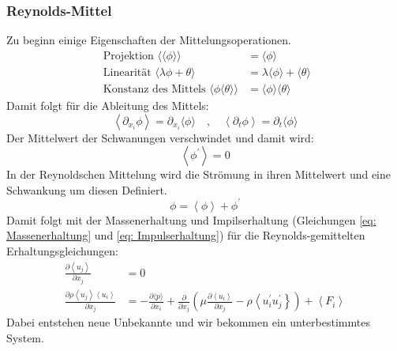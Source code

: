 \subsubsection{Reynolds-Mittel}
Zu beginn einige Eigenschaften der Mittelungsoperationen.
\begin{equation*}
	\begin{aligned}
		\text { Projektion }\langle\langle\phi\rangle\rangle &=\langle\phi\rangle \\
		\text { Linearität }\langle\lambda \phi+\theta\rangle &=\lambda\langle\phi\rangle+\langle\theta\rangle \\
		\text { Konstanz des Mittels }\langle\phi\langle\theta\rangle\rangle &=\langle\phi\rangle\langle\theta\rangle
	\end{aligned}
\end{equation*}
Damit folgt für die Ableitung des Mittels:
\begin{equation}
	\left\langle\partial_{x_{i}} \phi\right\rangle=\partial_{x_{i}}\langle\phi\rangle \quad, \quad\left\langle\partial_{t} \phi\right\rangle=\partial_{t}\langle\phi\rangle
\end{equation}
Der Mittelwert der Schwanungen verschwindet und damit wird: 
\begin{equation}
	\left\langle\phi^{\prime}\right\rangle=0
\end{equation}
In der Reynoldschen Mittelung wird die Strömung in ihren Mittelwert und eine Schwankung um diesen Definiert. 
\begin{equation}
	\phi = \left\langle\phi\right\rangle + \phi^{\prime}
\end{equation}
Damit folgt mit der Massenerhaltung und Impilserhaltung (Gleichungen \ref{eq: Massenerhaltung} und \ref{eq: Impulserhaltung}) für die Reynolds-gemittelten Erhaltungsgleichungen:
\begin{equation}
	\begin{aligned}
		\frac{\partial\left\langle u_{j}\right\rangle}{\partial x_{j}}&=0 \\
		\frac{\partial \rho\left\langle u_{j}\right\rangle\left\langle u_{i}\right\rangle}{\partial x_{j}}&=-\frac{\partial\langle p\rangle}{\partial x_{i}}+\frac{\partial}{\partial x_{j}}\left(\mu \frac{\partial\left\langle u_{i}\right\rangle}{\partial x_{j}}-\rho\left\langle u_{i}^{\prime} u_{j}^{\prime}\right\}\right)+\left\langle F_{i}\right\rangle
	\end{aligned}
\end{equation}
Dabei entstehen neue Unbekannte und wir bekommen ein unterbestimmtes System. 